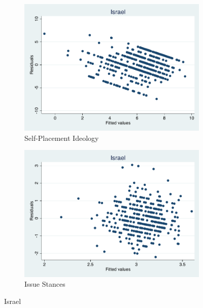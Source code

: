 \documentclass[12pt, titlepage]{article}
\begin{document}
\begin{figure}[H]
	\centering
	\begin{subfigure}[b]{0.475\textwidth}   
		\centering 
		\includegraphics[width=\textwidth]{Residuals/CountryIdeo/Israel}
		\caption{Self-Placement Ideology}
	\end{subfigure}
	\hfill
	\begin{subfigure}[b]{0.475\textwidth}
		\centering 
		\includegraphics[width=\textwidth]{Residuals/CountryLib/Israel}
		\caption{Issue Stances}
	\end{subfigure}
	\caption{Israel}
	\label{Israel}
\end{figure}
\end{document}
